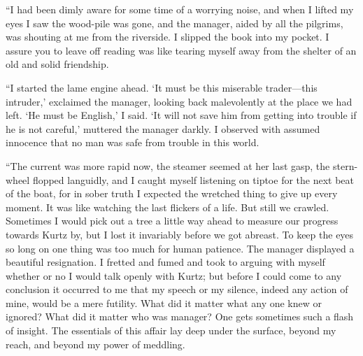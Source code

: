\documentclass[12pt]{report}
\begin{document}
``I had been dimly aware for some time of a worrying noise, and when I
lifted my eyes I saw the wood-pile was gone, and the manager, aided by
all the pilgrims, was shouting at me from the riverside. I slipped the
book into my pocket. I assure you to leave off reading was like tearing
myself away from the shelter of an old and solid friendship.

``I started the lame engine ahead. `It must be this miserable
trader---this intruder,' exclaimed the manager, looking back
malevolently at the place we had left. `He must be English,' I said. `It
will not save him from getting into trouble if he is not careful,'
muttered the manager darkly. I observed with assumed innocence that no
man was safe from trouble in this world.

``The current was more rapid now, the steamer seemed at her last gasp,
the stern-wheel flopped languidly, and I caught myself listening on
tiptoe for the next beat of the boat, for in sober truth I expected the
wretched thing to give up every moment. It was like watching the last
flickers of a life. But still we crawled. Sometimes I would pick out a
tree a little way ahead to measure our progress towards Kurtz by, but I
lost it invariably before we got abreast. To keep the eyes so long on
one thing was too much for human patience. The manager displayed a
beautiful resignation. I fretted and fumed and took to arguing with
myself whether or no I would talk openly with Kurtz; but before I could
come to any conclusion it occurred to me that my speech or my silence,
indeed any action of mine, would be a mere futility. What did it matter
what any one knew or ignored? What did it matter who was manager? One
gets sometimes such a flash of insight. The essentials of this affair
lay deep under the surface, beyond my reach, and beyond my power of
meddling.
\end{document}
